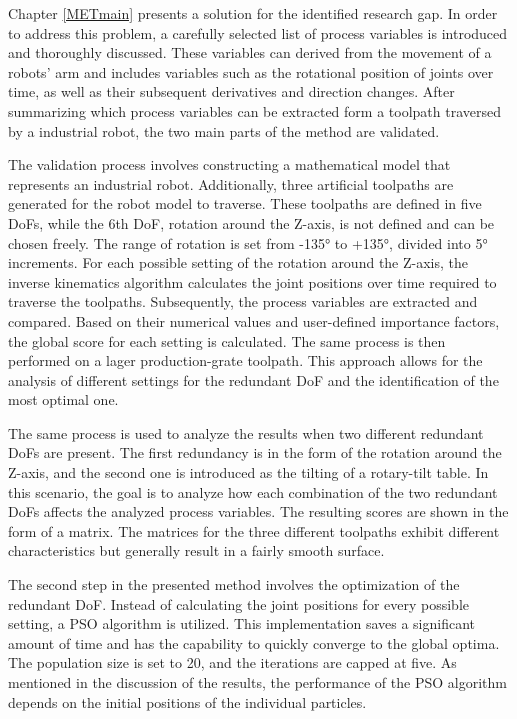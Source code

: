 Chapter \ref{METmain} presents a solution for the identified research gap. In order to address this problem, a carefully selected list of process variables is introduced and thoroughly discussed. These variables can derived from the movement of a robots' arm and includes variables such as the rotational position of joints over time, as well as their subsequent derivatives and direction changes.
After summarizing which process variables can be extracted form a toolpath traversed by a industrial robot, the two main parts of the method are validated. 


The validation process involves constructing a mathematical model that represents an industrial robot. Additionally, three artificial toolpaths are generated for the robot model to traverse. These toolpaths are defined in five \acrshort{DoF}s, while the 6th \acrshort{DoF}, rotation around the Z-axis, is not defined and can be chosen freely. The range of rotation is set from -135° to +135°, divided into 5° increments. For each possible setting of the rotation around the Z-axis, the inverse kinematics algorithm calculates the joint positions over time required to traverse the toolpaths. Subsequently, the process variables are extracted and compared. Based on their numerical values and user-defined importance factors, the global score for each setting is calculated. The same process is then performed on a lager production-grate toolpath. This approach allows for the analysis of different settings for the redundant \acrshort{DoF} and the identification of the most optimal one.

The same process is used to analyze the results when two different redundant \acrshort{DoF}s are present. The first redundancy is in the form of the rotation around the Z-axis, and the second one is introduced as the tilting of a rotary-tilt table. In this scenario, the goal is to analyze how each combination of the two redundant \acrshort{DoF}s affects the analyzed process variables. The resulting scores are shown in the form of a matrix. The matrices for the three different toolpaths exhibit different characteristics but generally result in a fairly smooth surface.

The second step in the presented method involves the optimization of the redundant \acrshort{DoF}. Instead of calculating the joint positions for every possible setting, a \acrshort{PSO} algorithm is utilized. This implementation saves a significant amount of time and has the capability to quickly converge to the global optima. The population size is set to 20, and the iterations are capped at five.
As mentioned in the discussion of the results, the performance of the PSO algorithm depends on the initial positions of the individual particles.

